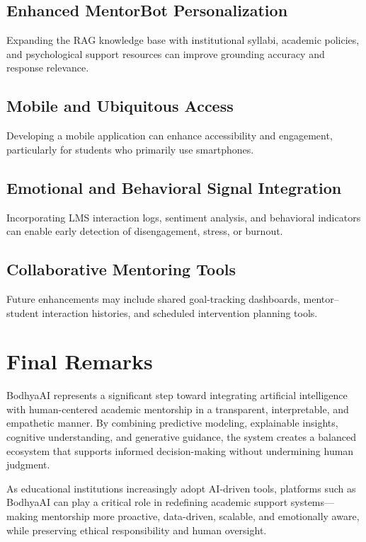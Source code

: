 \documentclass[12pt,a4paper]{report}
\begin{document}
\subsection{Enhanced MentorBot Personalization}
Expanding the RAG knowledge base with institutional syllabi, academic policies, and
psychological support resources can improve grounding accuracy and response relevance.

\subsection{Mobile and Ubiquitous Access}
Developing a mobile application can enhance accessibility and engagement, particularly
for students who primarily use smartphones.

\subsection{Emotional and Behavioral Signal Integration}
Incorporating LMS interaction logs, sentiment analysis, and behavioral indicators can
enable early detection of disengagement, stress, or burnout.

\subsection{Collaborative Mentoring Tools}
Future enhancements may include shared goal-tracking dashboards, mentor–student
interaction histories, and scheduled intervention planning tools.

\section{Final Remarks}

BodhyaAI represents a significant step toward integrating artificial intelligence with
human-centered academic mentorship in a transparent, interpretable, and empathetic
manner. By combining predictive modeling, explainable insights, cognitive understanding,
and generative guidance, the system creates a balanced ecosystem that supports informed
decision-making without undermining human judgment.

As educational institutions increasingly adopt AI-driven tools, platforms such as
BodhyaAI can play a critical role in redefining academic support systems—making
mentorship more proactive, data-driven, scalable, and emotionally aware, while
preserving ethical responsibility and human oversight.


\renewcommand{\bibname}{REFERENCES}

\nocite{*}
\end{document}
